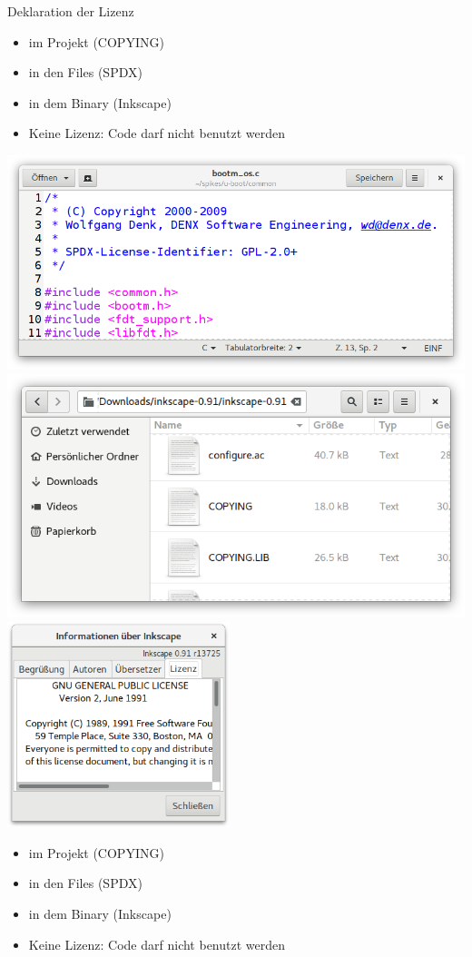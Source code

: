 \begin{frame}{Deklaration der Lizenz}
	\only<beamer:0|handout:1>
	{
	\begin{itemize}
		\item im Projekt (COPYING)
		\item in den Files (SPDX)
		\item in dem Binary (Inkscape)
		\item Keine Lizenz: Code darf nicht benutzt werden
	\end{itemize}
	}
	\begin{center}
		{
			\includegraphics[width=\textwidth]{res/lizenz-source.png}
		}
		\only<3|handout:3>
		{
			\includegraphics[width=\textwidth]{res/lizenz-file.png}
		}
		\only<4|handout:4>
		{
			\includegraphics[height=6cm]{res/lizenz-binary.png}
		}
	\end{center}
\end{frame}
\note
{
	\begin{itemize}
		\item im Projekt (COPYING)
		\item in den Files (SPDX)
		\item in dem Binary (Inkscape)
		\item Keine Lizenz: Code darf nicht benutzt werden
	\end{itemize}
}

